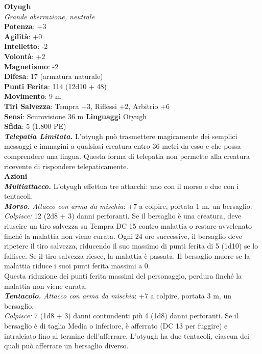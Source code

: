 \begin{multicols}{2}
\medskip\textbf{Otyugh}\\
\emph{Grande aberrazione, neutrale}\\
\textbf{Potenza}: +3\\
\textbf{Agilità}: +0\\
\textbf{Intelletto}: -2\\
\textbf{Volontà}: +2\\
\textbf{Magnetismo}: -2\\
\textbf{Difesa}: 17 (armatura naturale)\\
\textbf{Punti Ferita}: 114 (12d10 + 48)\\
\textbf{Movimento}: 9 m\\
\textbf{Tiri Salvezza}: Tempra +3, Riflessi +2, Arbitrio +6\\
\textbf{Sensi}: Scurovisione 36 m
\textbf{Linguaggi} Otyugh\\
\textbf{Sfida}: 5 (1.800 PE)\smallskip\\
\emph{\textbf{Telepatia Limitata.}} L'otyugh può trasmettere magicamente dei semplici messaggi e immagini a qualsiasi creatura entro 36 metri da esso e che possa comprendere una lingua. Questa forma di telepatia non permette alla creatura ricevente di rispondere telepaticamente.\\
\smallskip\textbf{Azioni}\\
\emph{\textbf{Multiattacco.}} L'otyugh effettua tre attacchi: uno con il morso e due con i tentacoli.\\
\emph{\textbf{Morso.} Attacco con arma da mischia}: +7 a colpire, portata 1 m, un bersaglio.\\

\emph{Colpisce:} 12 (2d8 + 3) danni perforanti. Se il bersaglio è una creatura, deve riuscire un tiro salvezza su Tempra DC 15 contro malattia o restare avvelenato finché la malattia non viene curata. Ogni 24 ore successive, il bersaglio deve ripetere il tiro salvezza, riducendo il suo massimo di punti ferita di 5 (1d10) se lo fallisce. Se il tiro salvezza riesce, la malattia è passata. Il bersaglio muore se la malattia riduce i suoi punti ferita massimi a 0.\\
Questa riduzione dei punti ferita massimi del personaggio, perdura  finché la malattia non viene curata.\\
\emph{\textbf{Tentacolo.} Attacco con arma da mischia}: +7 a colpire, portata 3 m, un bersaglio.\\
\emph{Colpisce:} 7 (1d8 + 3) danni contundenti più 4 (1d8) danni perforanti. Se il bersaglio è di taglia Media o inferiore, è afferrato (DC 13 per fuggire) e intralciato fino al termine dell'afferrare. L'otyugh ha due tentacoli, ciascun dei quali può afferrare un bersaglio diverso.\\


\end{multicols}
